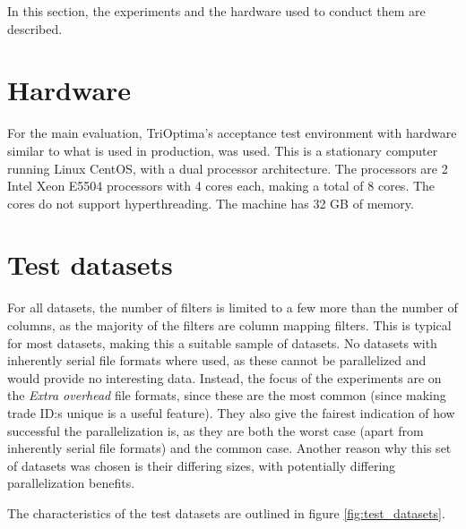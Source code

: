 In this section, the experiments and the hardware used to conduct them are described.

\section{Hardware}
For the main evaluation, TriOptima’s acceptance test environment with hardware similar to what is used in production, was used. This is a stationary computer running Linux CentOS,
with a dual processor architecture. The processors are 2 Intel Xeon E5504 processors with 4 cores each, making a total of 8 cores. The cores do not support hyperthreading. The machine
has 32 GB of memory.

\section{Test datasets}
For all datasets, the number of filters is limited to a few more than the number of columns, as the majority of the filters are column mapping filters.
This is typical for most datasets, making this a suitable sample of datasets. No datasets with inherently serial file formats where used, as these cannot be
parallelized and would provide no interesting data. Instead, the focus of the experiments are on the \textit{Extra overhead} file formats, since these are the
most common (since making trade ID:s unique is a useful feature). They also give the fairest indication of how successful the parallelization is, as they are
both the worst case (apart from inherently serial file formats) and the common case. Another reason why this set of datasets was chosen is their differing sizes,
with potentially differing parallelization benefits.

The characteristics of the test datasets are outlined in figure \ref{fig:test_datasets}.

